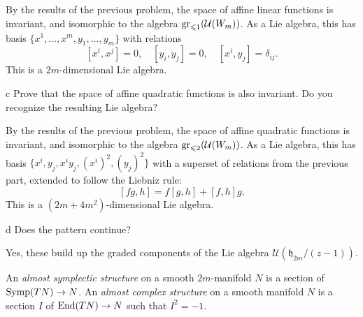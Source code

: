 \documentclass{pset}
\begin{document}
\begin{parts}
    By the results of the previous problem, the space of affine linear functions is invariant, and isomorphic to the algebra $\mathrm{gr}_{\leqslant 1}(\mathcal{U}(W_m))$. As a Lie algebra, this has basis $\{x^1,\ldots,x^m, y_1,\ldots,y_m\}$ with relations
    \[
        [x^i, x^j] = 0, \quad [y_i, y_j] = 0, \quad [x^i, y_j] = \delta_{ij}
    .\]
    This is a $2m$-dimensional Lie algebra.
    \begin{part}{c}
        Prove that the space of affine quadratic functions is also invariant. Do you recognize the resulting Lie algebra?
    \end{part}

    By the results of the previous problem, the space of affine quadratic functions is invariant, and isomorphic to the algebra $\mathrm{gr}_{\leqslant 2}(\mathcal{U}(W_m))$. As a Lie algebra, this has basis $\{x^i, y_j, x^iy_j, (x^i)^2, (y_j)^2\}$ with a superset of relations from the previous part, extended to follow the Liebniz rule:
    \[
        [fg, h] = f[g,h] + [f,h]g
    .\] 
    This is a $(2m+4m^2)$-dimensional Lie algebra.

    \begin{part}{d}
        Does the pattern continue?
    \end{part}

    Yes, these build up the graded components of the Lie algebra $\mathcal{U}(\mathfrak{h}_{2m} / (z-1))$.
\end{parts}

\begin{problem}{3}
    An \emph{almost symplectic structure} on a smooth $2m$-manifold $N$ is a section of $\mathrm{Symp}(TN) \to N$. An \emph{almost complex structure} on a smooth manifold $N$ is a section $I$ of $\textrm{End}(TN) \to N$ such that $I^2=-1$.
\end{problem}
\end{document}
